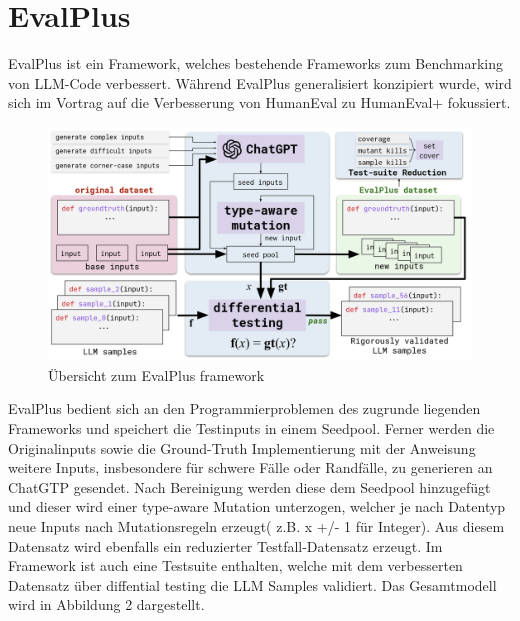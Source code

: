 \documentclass[fleqn,10pt]{wlscirep}
\begin{document}
\section*{EvalPlus}
EvalPlus ist ein Framework, welches bestehende Frameworks zum Benchmarking von LLM-Code verbessert. Während EvalPlus generalisiert konzipiert wurde, wird sich im Vortrag auf die Verbesserung von HumanEval zu HumanEval+ fokussiert. 

\begin{figure}
    \centering
    \includegraphics[width=0.8\paperwidth]{image/overviewEplus.png}
    \caption{Übersicht zum EvalPlus framework\cite{liu2024your}}
\end{figure}
EvalPlus bedient sich an den Programmierproblemen des zugrunde liegenden Frameworks und speichert die Testinputs in einem Seedpool. Ferner werden die Originalinputs sowie die Ground-Truth Implementierung mit der Anweisung weitere Inputs, insbesondere für schwere Fälle oder Randfälle, zu generieren an ChatGTP gesendet. Nach Bereinigung werden diese dem Seedpool hinzugefügt und dieser wird einer type-aware Mutation unterzogen, welcher je nach Datentyp neue Inputs nach Mutationsregeln erzeugt( z.B. x +/- 1 für Integer). Aus diesem Datensatz wird ebenfalls ein reduzierter Testfall-Datensatz erzeugt. Im Framework ist auch eine Testsuite enthalten, welche mit dem verbesserten Datensatz über diffential testing die LLM Samples validiert. Das Gesamtmodell wird in Abbildung 2 dargestellt.
\end{document}
